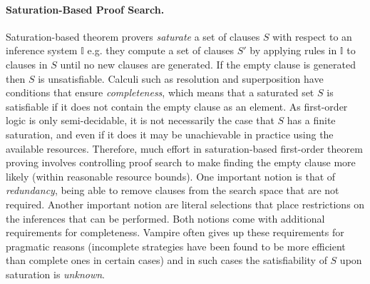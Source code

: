 \documentclass{llncs}
\begin{document}

\paragraph{Saturation-Based Proof Search.}

Saturation-based theorem provers \emph{saturate} a set of clauses $S$ with respect to an inference system $\mathbb{I}$ e.g. they compute a set of clauses $S'$ by applying rules in $\mathbb{I}$ to clauses in $S$ until no new clauses are generated. 
%
If the empty clause is generated then $S$ is unsatisfiable.
%
Calculi such as resolution and superposition have conditions that ensure \emph{completeness}, which means that a saturated set $S$ is satisfiable if it does not contain the empty clause as an element.
%
As first-order logic is only semi-decidable, it is not necessarily the case that $S$ has a finite saturation, and even if it does it may be unachievable in practice using the available resources. 
%
Therefore, much effort in saturation-based first-order theorem proving involves 
controlling proof search to make finding the empty clause more likely (within reasonable resource bounds). 
%
One important notion is that of \emph{redundancy}, being able to remove clauses from the search space that are not required. 
%
Another important notion are literal selections that place restrictions on the inferences that can be performed. 
%
Both notions come with additional requirements for completeness. Vampire often gives up these requirements for pragmatic reasons (incomplete strategies have been found to be more efficient than complete ones in certain cases) and in such cases the satisfiability of $S$ upon saturation is \emph{unknown}.
\end{document}
